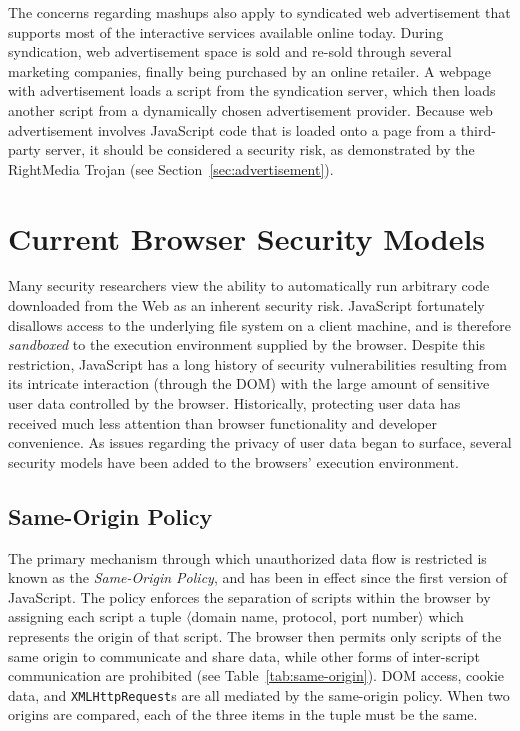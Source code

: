 \documentclass{acmtrans2m}
\begin{document}
The concerns regarding mashups also apply to syndicated web advertisement that supports most of the interactive services available online today.
During syndication, web advertisement space is sold and re-sold through several marketing companies, finally being purchased by an online retailer.
A webpage with advertisement loads a script from the syndication server, which then loads another script from a dynamically chosen advertisement provider.
Because web advertisement involves JavaScript code that is loaded onto a page from a third-party server, it should be considered a security risk, as demonstrated by the RightMedia Trojan (see Section~\ref{sec:advertisement}).

\section{Current Browser Security Models}\label{sec:current-security-models}
Many security researchers view the ability to automatically run arbitrary code downloaded from the Web as an inherent security risk.
JavaScript fortunately disallows access to the underlying file system on a client machine, and is therefore \emph{sandboxed} to the execution environment supplied by the browser.
Despite this restriction, JavaScript has a long history of security vulnerabilities resulting from its intricate interaction (through the DOM) with the large amount of sensitive user data controlled by the browser.
Historically, protecting user data has received much less attention than browser functionality and developer convenience.
As issues regarding the privacy of user data began to surface, several security models have been added to the browsers' execution environment.

\subsection{Same-Origin Policy}\label{sec:same-origin}
The primary mechanism through which unauthorized data flow is restricted is known as the \emph{Same-Origin Policy}, and has been in effect since the first version of JavaScript.
The policy enforces the separation of scripts within the browser by assigning each script a tuple $\langle$domain name, protocol, port number$\rangle$ which represents the origin of that script.
The browser then permits only scripts of the same origin to communicate and share data, while other forms of inter-script communication are prohibited (see Table~\ref{tab:same-origin}).
DOM access, cookie data, and \texttt{XMLHttpRequest}s are all mediated by the same-origin policy.
When two origins are compared, each of the three items in the tuple must be the same.
\end{document}

